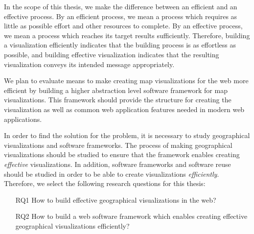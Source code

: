 In the scope of this thesis, we make the difference between an efficient and an effective process. By an efficient process, we mean a process which requires as little as possible effort and other resources to complete. By an effective process, we mean a process which reaches its target results sufficiently. Therefore, building a visualization efficiently indicates that the building process is as effortless as possible, and building effective visualization indicates that the resulting visualization conveys its intended message appropriately.

We plan to evaluate means to make creating map visualizations for the web more efficient by building a higher abstraction level software framework for map visualizations. This framework should provide the structure for creating the visualization as well as common web application features needed in modern web applications.

In order to find the solution for the problem, it is necessary to study geographical visualizations and software frameworks. The process of making geographical visualizations should be studied to ensure that the framework enables creating \emph{effective} visualizations. In addition, software frameworks and software reuse should be studied in order to be able to create visualizations \emph{efficiently}. Therefore, we select the following research questions for this thesis:

\begin{enumerate}
	\item[RQ1] How to build effective geographical visualizations in the web?
	\item[RQ2] How to build a web software framework which enables creating effective geographical visualizations efficiently?

\end{enumerate}



